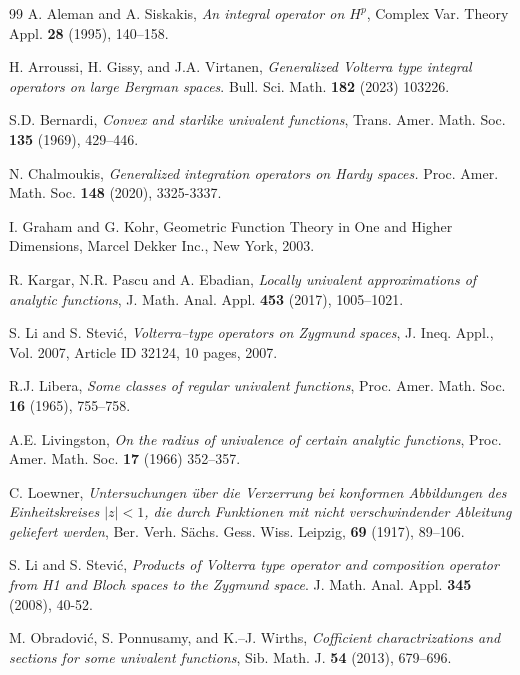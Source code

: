 \documentclass[12pt,a4paper]{amsart}
\numberwithin{equation}{section}
\theoremstyle{remark}
\begin{document}
\begin{thebibliography}{99}
 A. Aleman and A. Siskakis, \textit{An integral operator on $H^p$}, Complex Var. Theory Appl. {\bf28} (1995), 140--158.

H. Arroussi, H. Gissy, and J.A. Virtanen, \textit{Generalized Volterra type integral operators on large Bergman spaces}. Bull. Sci. Math. \textbf{182} (2023) 103226.

 S.D. Bernardi, \textit{Convex and starlike univalent functions}, Trans. Amer. Math. Soc. {\bf135} (1969), 429--446.

N. Chalmoukis, \textit{Generalized integration operators on Hardy spaces.} Proc. Amer. Math. Soc. \textbf{148} (2020), 3325-3337.


 I. Graham and G. Kohr, Geometric Function Theory in One and Higher Dimensions, Marcel Dekker Inc., New York, 2003.

 R. Kargar, N.R. Pascu and A. Ebadian, \textit{Locally univalent approximations of analytic functions}, J. Math. Anal. Appl. {\bf453} (2017), 1005--1021.

 S. Li and S. Stevi\'{c}, \textit{Volterra--type operators on Zygmund spaces}, J. Ineq. Appl., Vol. 2007, Article ID 32124, 10 pages, 2007.

 R.J. Libera, \textit{Some classes of regular univalent functions}, Proc. Amer. Math. Soc. {\bf16} (1965), 755--758.

 A.E. Livingston, \textit{On the radius of univalence of certain analytic functions}, Proc. Amer. Math. Soc. {\bf17} (1966) 352--357.

 C. Loewner, \textit{Untersuchungen \"{u}ber die Verzerrung bei konformen Abbildungen des Einheitskreises $|z|<1$, die durch Funktionen mit nicht verschwindender Ableitung geliefert werden},
Ber. Verh. S\"{a}chs. Gess. Wiss. Leipzig, {\bf69} (1917), 89--106.

S. Li and S. Stevi\'{c}, \textit{Products of Volterra type operator and composition operator from H1 and Bloch spaces to the Zygmund space}. J. Math. Anal. Appl. \textbf{345} (2008), 40-52.


 M. Obradovi\'{c}, S. Ponnusamy, and K.--J. Wirths, \textit{%
Cofficient charactrizations and sections for some univalent functions},
Sib. Math. J. {\bf 54} (2013), 679--696.


\end{thebibliography}
\end{document}
